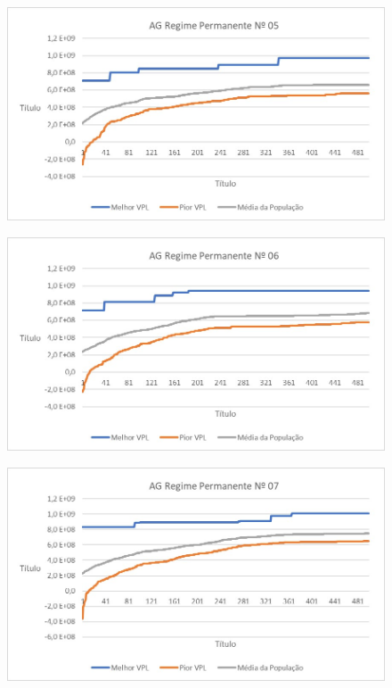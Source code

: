 \documentclass[12pt,a4paper]{report}
\begin{document}
\begin{figure}[H]
\centering

\includegraphics[scale=1]{AGRP/5}

\end{figure}
\begin{figure}[H]
\centering

\includegraphics[scale=1]{AGRP/6}

\end{figure}
\begin{figure}[H]
\centering

\includegraphics[scale=1]{AGRP/7}

\end{figure}
\end{document}
